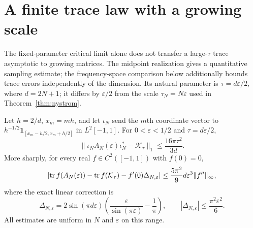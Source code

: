 \section{A finite trace law with a growing scale}\label{v7:sec:finite-trace}
The fixed-parameter critical limit alone does not transfer a large-$\tau$
trace asymptotic to growing matrices.  The midpoint realization gives a quantitative sampling estimate; the
frequency-space comparison below additionally bounds trace errors independently
of the dimension.  Its natural parameter is
$\tau=d\varepsilon/2$, where $d=2N+1$; it differs by $\varepsilon/2$ from the
scale $\tau_N=N\varepsilon$ used in Theorem~\ref{thm:nystrom}.

\begin{theorem}\label{v7:thm:finite-transfer}
Let $h=2/d$, $x_m=mh$, and let $\iota_N$ send the $m$th coordinate vector
to $h^{-1/2}\mathbf1_{[x_m-h/2,x_m+h/2]}$ in $L^2[-1,1]$.
For $0<\varepsilon<1/2$ and $\tau=d\varepsilon/2$,
\begin{equation}\label{v7:eq:nuclear-transfer}
 \|\iota_N A_N(\varepsilon)\iota_N^*-\mathcal K_\tau\|_1
 \le\frac{16\pi\tau^2}{3d}.
\end{equation}
More sharply, for every real $f\in C^2([-1,1])$ with $f(0)=0$,
\begin{equation}\label{v7:eq:smooth-transfer}
 \left|\operatorname{tr} f(A_N(\varepsilon))-\operatorname{tr} f(\mathcal K_\tau)
                -f'(0)\Delta_{N,\varepsilon}\right|
 \le\frac{5\pi^2}{9}d\varepsilon^3\|f''\|_\infty,
\end{equation}
where the exact linear correction is
\begin{equation}\label{v7:eq:linear-correction}
 \Delta_{N,\varepsilon}
 =2\sin(\pi d\varepsilon)
       \left(\frac{\varepsilon}{\sin(\pi\varepsilon)}-\frac1\pi\right),
 \qquad |\Delta_{N,\varepsilon}|\le\frac{\pi^2\varepsilon^2}{6}.
\end{equation}
All estimates are uniform in $N$ and $\varepsilon$ on this range.
\end{theorem}

